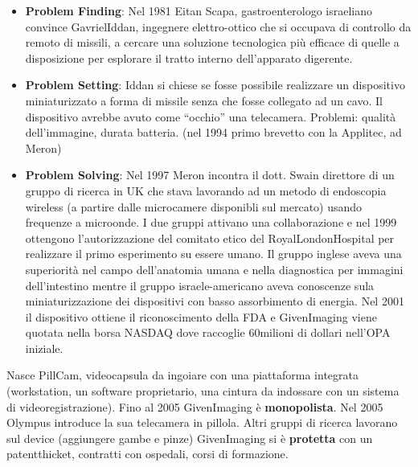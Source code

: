 \documentclass{article}
\begin{document}
\begin{itemize}
	\item  \textbf{Problem Finding}: Nel 1981 Eitan Scapa, gastroenterologo israeliano convince GavrielIddan, ingegnere elettro-ottico che si occupava di controllo da remoto di missili,  a cercare una soluzione tecnologica più efficace di quelle a disposizione per esplorare il tratto interno dell’apparato digerente.
	\item  \textbf{Problem Setting}: Iddan si chiese se fosse possibile realizzare un dispositivo miniaturizzato a forma di missile senza che fosse collegato ad un cavo. Il dispositivo avrebbe avuto come “occhio” una telecamera. Problemi: qualità dell’immagine, durata batteria. (nel 1994 primo brevetto con la Applitec, ad Meron)  
	\item \textbf{Problem Solving}:  Nel 1997 Meron incontra  il dott. Swain direttore di un gruppo di ricerca in UK che stava lavorando ad un metodo di endoscopia wireless (a partire dalle microcamere disponibli sul mercato) usando frequenze a microonde. I due gruppi attivano una collaborazione e nel 1999 ottengono l’autorizzazione del comitato etico del RoyalLondonHospital per realizzare il primo esperimento su essere umano.
	Il gruppo inglese aveva una superiorità nel campo dell’anatomia umana e nella diagnostica per immagini dell’intestino mentre il gruppo israele-americano aveva conoscenze sula miniaturizzazione  dei dispositivi con basso assorbimento di energia. Nel 2001 il dispositivo ottiene il riconoscimento della FDA e GivenImaging viene quotata nella borsa NASDAQ dove raccoglie 60milioni di dollari nell’OPA iniziale.
\end{itemize}
Nasce PillCam, videocapsula da ingoiare con una piattaforma integrata (workstation, un software proprietario, una cintura da indossare con un sistema di videoregistrazione).
Fino al 2005 GivenImaging è \textbf{monopolista}. Nel 2005 Olympus introduce la sua telecamera in pillola. Altri gruppi di ricerca lavorano sul device (aggiungere gambe e pinze) GivenImaging si è \textbf{protetta} con un  patentthicket, contratti con  ospedali, corsi di formazione.
\end{document}
